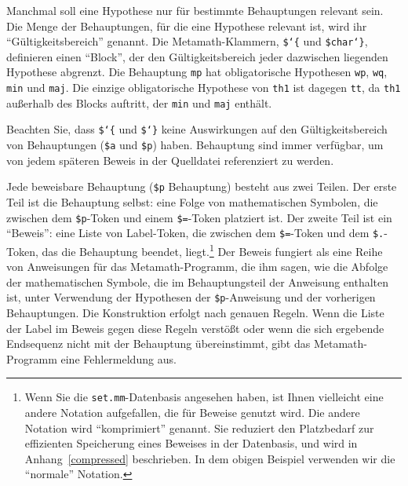 Manchmal soll eine Hypothese nur für bestimmte Behauptungen relevant sein.
Die Menge der Behauptungen, für die eine Hypothese relevant ist, wird ihr "`Gültigkeitsbereich"' genannt.  Die Metamath-Klammern, \texttt{\$\char`\{} und \texttt{\$char`\}}, definieren einen "`Block"', der den Gültigkeitsbereich jeder dazwischen liegenden Hypothese abgrenzt.  Die Behauptung \texttt{mp} hat obligatorische Hypothesen \texttt{wp}, \texttt{wq}, \texttt{min} und \texttt{maj}.  Die einzige obligatorische Hypothese von \texttt{th1} ist dagegen \texttt{tt}, da \texttt{th1} außerhalb des Blocks auftritt, der \texttt{min} und \texttt{maj} enthält.

Beachten Sie, dass \texttt{\$\char`\{} und \texttt{\$\char`\}} keine Auswirkungen auf den Gültigkeitsbereich von Behauptungen (\texttt{\$a} und \texttt{\$p}) haben.  Behauptung sind immer verfügbar, um von jedem späteren Beweis in der Quelldatei referenziert zu werden.

Jede beweisbare Behauptung (\texttt{\$p} Behauptung) besteht aus zwei Teilen.  Der erste Teil ist die Behauptung selbst: eine Folge von mathematischen Symbolen, die zwischen dem \texttt{\$p}-Token und einem \texttt{\$=}-Token platziert ist.  Der zweite Teil ist ein "`Beweis"': eine Liste von Label-Token, die zwischen dem \texttt{\$=}-Token und dem \texttt{\$.}-Token, das die Behauptung beendet, liegt.\footnote{Wenn Sie die \texttt{set.mm}-Datenbasis angesehen haben, ist Ihnen vielleicht eine andere Notation aufgefallen, die für
Beweise genutzt wird.  Die andere Notation wird "`komprimiert"' genannt. Sie reduziert den Platzbedarf zur effizienten Speicherung eines Beweises in der Datenbasis, und wird in Anhang~\ref{compressed} beschrieben.  In dem obigen Beispiel verwenden wir die "`normale"' Notation.}
Der Beweis fungiert als eine Reihe von Anweisungen für das Metamath-Programm, die ihm sagen, wie die Abfolge der mathematischen Symbole, die im Behauptungsteil der Anweisung enthalten ist, unter Verwendung der Hypothesen der \texttt{\$p}-Anweisung und der vorherigen Behauptungen.  Die Konstruktion erfolgt nach genauen Regeln.  Wenn die Liste der Label im Beweis gegen diese Regeln verstößt oder wenn die sich ergebende Endsequenz nicht mit der Behauptung übereinstimmt, gibt das Metamath-Programm eine Fehlermeldung aus.

